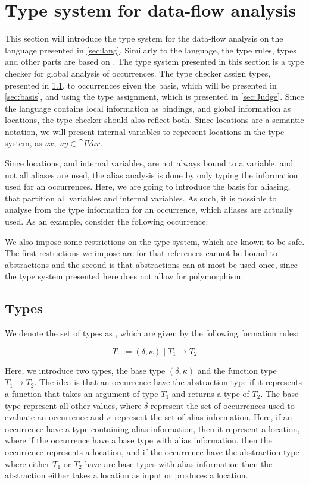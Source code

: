 \documentclass[../../master.tex]{subfiles}
\begin{document}
\section{Type system for data-flow analysis}\label{sec:TypeSys}
This section will introduce the type system for the data-flow analysis on the language presented in \cref{sec:lang}.
Similarly to the language, the type rules, types and other parts are based on \cite{DVNicky}.
The type system presented in this section is a type checker for global analysis of occurrences.
The type checker assign types, presented in \cref{sec:types}, to occurrences given the basis, which will be presented in \cref{sec:basis}, and using the type assignment, which is presented in \cref{sec:Judge}.
Since the language contains local information as bindings, and global information as locations, the type checker should also reflect both.
Since locations are a semantic notation, we will present internal variables to represent locations in the type system, as $\nu x,\; \nu y\in\cat{IVar}$.

Since locations, and internal variables, are not always bound to a variable, and not all aliases are used, the alias analysis is done by only typing the information used for an occurrences.
Here, we are going to introduce the basis for aliasing, that partition all variables and internal variables.
As such, it is possible to analyse from the type information for an occurrence, which aliases are actually used.
As an example, consider the following occurrence:

We also impose some restrictions on the type system, which are known to be safe.
The first restrictions we impose are for that references cannot be bound to abstractions and the second is that abstractions can at most be used once, since the type system presented here does not allow for polymorphism.

\subsection{Types}\label{sec:types}
We denote the set of types as , which are given by the following formation rules:

$$T::=(\delta,\kappa)\mid T_1 \rightarrow T_2$$

Here, we introduce two types, the base type $(\delta,\kappa)$ and the function type $T_1 \rightarrow T_2$.
The idea is that an occurrence have the abstraction type if it represents a function that takes an argument of type $T_1$ and returns a type of $T_2$.
The base type represent all other values, where $\delta$ represent the set of occurrences used to evaluate an occurrence and $\kappa$ represent the set of alias information.
Here, if an occurrence have a type containing alias information, then it represent a location, where if the occurrence have a base type with alias information, then the occurrence represents a location, 
and if the occurrence have the abstraction type where either $T_1$ or $T_2$ have are base types with alias information then the abstraction either takes a location as input or produces a location.
\end{document}
